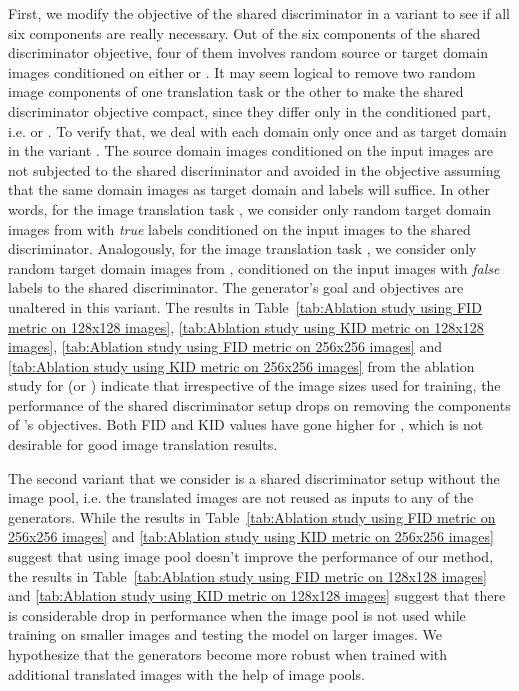 \documentclass[a4paper,twoside]{article}
\begin{document}
First, we modify the objective of the shared discriminator in a variant  to see if all six components are really necessary. Out of the six components of the shared discriminator objective, four of them involves random source or target domain images conditioned on either  or . It may seem logical to remove two random image components of one translation task or the other to make the shared discriminator objective compact, since they differ only in the conditioned part, i.e.  or . To verify that, we deal with each domain only once and as target domain in the variant . The source domain images conditioned on the input images are not subjected to the shared discriminator and avoided in the objective assuming that the same domain images as target domain and labels will suffice. In other words, for the image translation task , we consider only random target domain images  from  with \textit{true} labels conditioned on the input images  to the shared discriminator. Analogously, for the image translation task , we consider only random target domain images  from , conditioned on the input images  with \textit{false} labels to the shared discriminator. The generator's goal and objectives are unaltered in this variant. The results in Table~\ref{tab:Ablation study using FID metric on 128x128 images}, \ref{tab:Ablation study using KID metric on 128x128 images}, \ref{tab:Ablation study using FID metric on 256x256 images} and \ref{tab:Ablation study using KID metric on 256x256 images} from the ablation study for (or \textit{}) indicate that irrespective of the image sizes used for training, the performance of the shared discriminator setup drops on removing the components of 's objectives. Both FID and KID values have gone higher for , which is not desirable for good image translation results.

The second variant that we consider is a shared discriminator setup without the image pool, i.e. the translated images are not reused as inputs to any of the generators. While the results in Table~\ref{tab:Ablation study using FID metric on 256x256 images} and \ref{tab:Ablation study using KID metric on 256x256 images} suggest that using image pool doesn't improve the performance of our method, the results in Table~\ref{tab:Ablation study using FID metric on 128x128 images} and \ref{tab:Ablation study using KID metric on 128x128 images} suggest that there is considerable drop in performance when the image pool is not used while training on smaller images and testing the model on larger images. We hypothesize that the generators become more robust when trained with additional translated images with the help of image pools.
\end{document}
